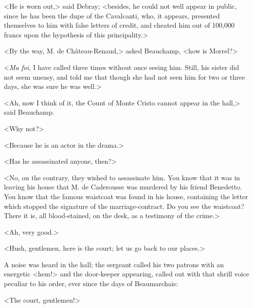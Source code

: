  <He is worn out,> said Debray; <besides, he could not well appear in public, since he has been the dupe of the Cavalcanti, who, it appears, presented themselves to him with false letters of credit, and cheated him out of 100,000 francs upon the hypothesis of this principality.> 

 <By the way, M. de Château-Renaud,> asked Beauchamp, <how is Morrel?> 

 <\textit{Ma foi}, I have called three times without once seeing him. Still, his sister did not seem uneasy, and told me that though she had not seen him for two or three days, she was sure he was well.> 

 <Ah, now I think of it, the Count of Monte Cristo cannot appear in the hall,> said Beauchamp. 

 <Why not?> 

 <Because he is an actor in the drama.> 

 <Has he assassinated anyone, then?> 

 <No, on the contrary, they wished to assassinate him. You know that it was in leaving his house that M. de Caderousse was murdered by his friend Benedetto. You know that the famous waistcoat was found in his house, containing the letter which stopped the signature of the marriage-contract. Do you see the waistcoat? There it is, all blood-stained, on the desk, as a testimony of the crime.> 

 <Ah, very good.> 

 <Hush, gentlemen, here is the court; let us go back to our places.> 

 A noise was heard in the hall; the sergeant called his two patrons with an energetic <hem!> and the door-keeper appearing, called out with that shrill voice peculiar to his order, ever since the days of Beaumarchais: 

 <The court, gentlemen!> 